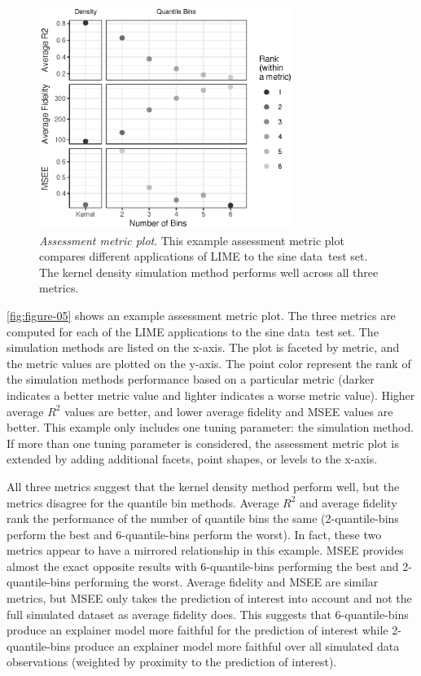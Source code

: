 \documentclass[AMS,STIX2COL]{WileyNJD-v2}\usepackage[]{graphicx}\usepackage[]{color}
\newenvironment{knitrout}{}{} %
\newcommand{\data}{sine data}
\renewcommand{\sout}[1]{\unskip}
\begin{document}
\begin{figure}[!bp]
\begin{knitrout}
\color{fgcolor}

{\centering \includegraphics[width=3.25in]{figure-05-1} 

}



\end{knitrout}
\caption{\emph{Assessment metric plot}. This example assessment metric plot  compares different applications of LIME to the \data \ test set. The kernel density simulation method performs well across all three metrics.}
\label{fig:figure-05}
\end{figure}

\autoref{fig:figure-05} shows an example assessment metric plot. The three metrics are computed for each of the LIME applications to the \data \ test set. The simulation methods are listed on the x-axis. The plot is faceted by metric, and the metric values are plotted on the y-axis. The point color represent the rank of the simulation methods performance based on a particular metric (darker indicates a better metric value and lighter indicates a worse metric value). Higher average $R^2$ values are better, and lower average fidelity and MSEE values are better. This example only includes one tuning parameter: the simulation method. If more than one tuning parameter is considered, the assessment metric plot is extended by adding additional facets, point shapes, or levels to the x-axis.

All three metrics suggest that the kernel density method perform\sout{ed} well, but the metrics disagree for the quantile bin\sout{s} methods. Average $R^2$ and average fidelity rank the performance of the number of quantile bins the same (2-quantile-bins perform the best and 6-quantile-bins perform the worst). In fact, these two metrics appear to have a mirrored relationship in this example. MSEE provides almost the exact opposite results with 6-quantile-bins performing the best and 2-quantile-bins performing the worst. Average fidelity and MSEE are similar metrics, but MSEE only takes the prediction of interest into account and not the full simulated dataset as average fidelity does. This suggests that 6-quantile-bins produce an explainer model more faithful for the prediction of interest while 2-quantile-bins produce an explainer model more faithful over all simulated data observations (weighted by proximity to the prediction of interest). 
\end{document}
